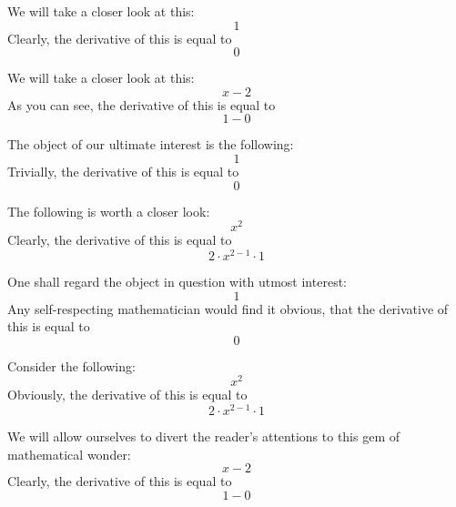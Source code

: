 \documentclass{article}
\begin{document}
We will take a closer look at this:
\begin{equation}
1 
\end{equation}
Clearly, the derivative of this is equal to
\begin{equation}
0 
\end{equation}

We will take a closer look at this:
\begin{equation}
x - 2 
\end{equation}
As you can see, the derivative of this is equal to
\begin{equation}
1 - 0 
\end{equation}

The object of our ultimate interest is the following:
\begin{equation}
1 
\end{equation}
Trivially, the derivative of this is equal to
\begin{equation}
0 
\end{equation}

The following is worth a closer look:
\begin{equation}
x ^{2 } 
\end{equation}
Clearly, the derivative of this is equal to
\begin{equation}
2 \cdot x ^{2 - 1 } \cdot 1 
\end{equation}

One shall regard the object in question with utmost interest:
\begin{equation}
1 
\end{equation}
Any self-respecting mathematician would find it obvious, that the derivative of this is equal to
\begin{equation}
0 
\end{equation}

Consider the following:
\begin{equation}
x ^{2 } 
\end{equation}
Obviously, the derivative of this is equal to
\begin{equation}
2 \cdot x ^{2 - 1 } \cdot 1 
\end{equation}

We will allow ourselves to divert the reader's attentions to this gem of mathematical wonder:
\begin{equation}
x - 2 
\end{equation}
Clearly, the derivative of this is equal to
\begin{equation}
1 - 0 
\end{equation}
\end{document}
